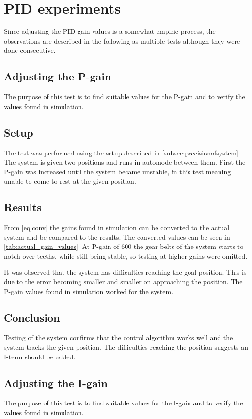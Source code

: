 \section{PID experiments}\label{sec:pid_experiments}
Since adjusting the PID gain values is a somewhat empiric process, the
observations are described in the following as multiple tests although they were
done consecutive.

\subsection{Adjusting the P-gain}\label{sec:pid_experiments_p}
The purpose of this test is to find suitable values for the P-gain and to verify
the values found in simulation.

\subsection*{Setup} The test was performed using the setup described in
\ref{subsec:precisionofsystem}. The system is given two positions and runs in
automode between them. First the P-gain was increased until the system became
unstable, in this test meaning unable to come to rest at the given position.

\subsection*{Results} From \ref{eq:conv} the gains found in simulation can be
converted to the actual system and be compared to the results. The converted
values can be seen in \ref{tab:actual_gain_values}. At P-gain of 600 the gear
belts of the system starts to notch over teeths, while still being stable, so
testing at higher gains were omitted.

It was observed that the system has difficulties reaching
the goal position. This is due to the error becoming smaller and smaller on
approaching the position. The P-gain values found in simulation worked for the
system.

\subsection*{Conclusion} Testing of the system confirms that the control
algorithm works well and the system tracks the given position. The difficulties
reaching the position suggests an I-term should be added.

\subsection{Adjusting the I-gain}\label{sec:pid_experiments_i}
The purpose of this test is to find suitable values for the I-gain and to verify
the values found in simulation.

